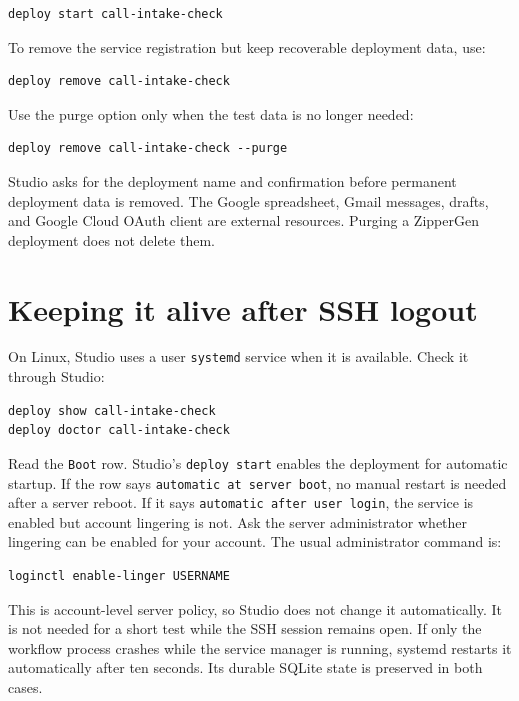 \documentclass[11pt,a4paper]{article}
\begin{document}
\begin{lstlisting}[style=shell]
deploy start call-intake-check
\end{lstlisting}

To remove the service registration but keep recoverable deployment data, use:

\begin{lstlisting}[style=shell]
deploy remove call-intake-check
\end{lstlisting}

Use the purge option only when the test data is no longer needed:

\begin{lstlisting}[style=shell]
deploy remove call-intake-check --purge
\end{lstlisting}

Studio asks for the deployment name and confirmation before permanent
deployment data is removed. The Google spreadsheet, Gmail messages, drafts,
and Google Cloud OAuth client are external resources. Purging a ZipperGen
deployment does not delete them.

\section{Keeping it alive after SSH logout}

On Linux, Studio uses a user \texttt{systemd} service when it is available.
Check it through Studio:

\begin{lstlisting}[style=shell]
deploy show call-intake-check
deploy doctor call-intake-check
\end{lstlisting}

Read the \texttt{Boot} row. Studio's \texttt{deploy start} enables the
deployment for automatic startup. If the row says
\texttt{automatic at server boot}, no manual restart is needed after a server
reboot. If it says \texttt{automatic after user login}, the service is enabled
but account lingering is not. Ask the server administrator whether lingering
can be enabled for your account. The usual administrator command is:

\begin{lstlisting}[style=shell]
loginctl enable-linger USERNAME
\end{lstlisting}

This is account-level server policy, so Studio does not change it
automatically. It is not needed for a short test while the SSH session remains
open. If only the workflow process crashes while the service manager is
running, systemd restarts it automatically after ten seconds. Its durable
SQLite state is preserved in both cases.
\end{document}
